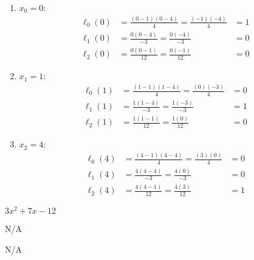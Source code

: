 \begin{answer}
    \renewcommand{\labelenumi}{(\alph{enumi})}
    \begin{enumerate}
        \item $x_0 = 0$:
        \begin{align*}
            \ell_0(0) &= \frac{(0-1)(0-4)}{4} = \frac{(-1)(-4)}{4} &= 1\\
            \ell_1(0) &= \frac{0(0-4)}{-3} = \frac{0(-4)}{-3} &= 0\\
            \ell_2(0) &= \frac{0(0-1)}{12} = \frac{0(-1)}{12} &= 0
        \end{align*}
        \item $x_1 = 1$:
        \begin{align*}
            \ell_0(1) &= \frac{(1-1)(1-4)}{4} = \frac{(0)(-3)}{4} &= 0\\
            \ell_1(1) &= \frac{1(1-4)}{-3} = \frac{1(-3)}{-3} &= 1\\
            \ell_2(1) &= \frac{1(1-1)}{12} = \frac{1(0)}{12} &= 0
        \end{align*}
        \item $x_2 = 4$:
        \begin{align*}
            \ell_0(4) &= \frac{(4-1)(4-4)}{4} = \frac{(3)(0)}{4} &= 0\\
            \ell_1(4) &= \frac{4(4-4)}{-3} = \frac{4(0)}{-3} &= 0\\
            \ell_2(4) &= \frac{4(4-1)}{12} = \frac{4(3)}{12} &= 1
        \end{align*}
    \end{enumerate}
\end{answer}

\begin{answer}
    $3x^2 + 7x - 12$
\end{answer}

\begin{answer}
    N/A
\end{answer}

\begin{answer}
    N/A
\end{answer}